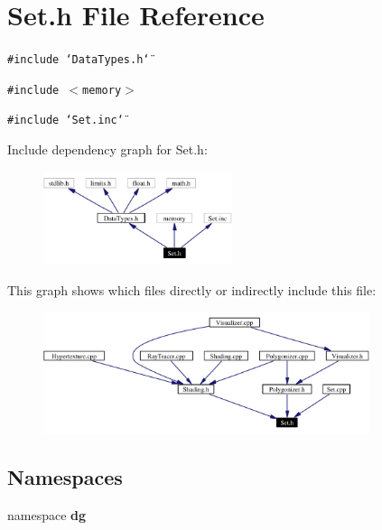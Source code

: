 \section{Set.h File Reference}
\label{Set_8h}
{\tt \#include \char`\"{}Data\-Types.h\char`\"{}}\par
{\tt \#include $<$memory$>$}\par
{\tt \#include \char`\"{}Set.inc\char`\"{}}\par


Include dependency graph for Set.h:\begin{figure}[H]
\begin{center}
\leavevmode
\includegraphics[width=157pt]{Set_8h__incl}
\end{center}
\end{figure}


This graph shows which files directly or indirectly include this file:\begin{figure}[H]
\begin{center}
\leavevmode
\includegraphics[width=271pt]{Set_8h__dep__incl}
\end{center}
\end{figure}
\subsection*{Namespaces}
\begin{CompactItemize}
\item 
namespace {\bf dg}
\end{CompactItemize}
